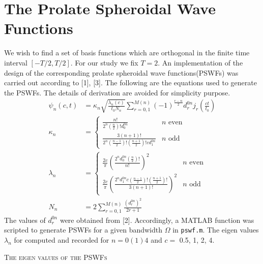 \documentclass[a4paper,10pt]{article}
\begin{document}
\section{The Prolate Spheroidal Wave Functions}
We wish to find a set of basis functions which are orthogonal in the finite time interval $[-T/2, T/2]$. For our study we fix $T=2$. An implementation of the design of the corresponding prolate spheroidal wave functions(PSWFs) was carried out according to [1], [3]. The following are the equations used to generate the PSWFs. The details of derivation are avoided for simplicity purpose.
\begin{align}
\psi_n(c, t) &=  \kappa_n  \sqrt{ \frac{\lambda_n(c)}{t_0 N_n} }\sum_{r=0,1}^{M(n)} (-1)^{\frac{r-n}{2}} d_r^{0n} j_r \left(\frac{ct}{t_0}\right) \\
\kappa_n &=  \begin{cases} 
      \frac{n!}{2^n ( \frac{n}{2})!  d_0^{0n} }  & n \text{ even} \\
      \frac{3 (n+1)!}{2^n ( \frac{n-1}{2})! ( \frac{n+1}{2} )! c d_1^{0n} } & n \text{ odd}
   \end{cases} \nonumber \\
\lambda_n &=  \begin{cases}
				\frac{2c}{\pi} \left( \frac{2^n d_0^{0n} ( \frac{n}{2})! }{n!} \right)^2 & n \text{ even} \nonumber \\
				\frac{2c}{\pi} \left( \frac{2^n d_1^{0n} c ( \frac{n-1}{2})! ( \frac{n+1}{2})! }{3(n+1)!} \right)^2 & n \text{ odd}
   \end{cases} \nonumber \\
N_n &= 2 \sum_{r=0,1}^{M(n)} \frac{(d_r^{0n})^2}{2r+1} \nonumber
\end{align} 
The values of $d_r^{0n}$ were obtained from [2]. Accordingly, a MATLAB function was scripted to generate PSWFs for a given bandwidth $\Omega$ in \texttt{pswf.m}. The eigen values $\lambda_n$ for computed and recorded for $n = 0(1)4$ and $c = $ 0.5, 1, 2, 4.
\begin{center}
\textsc{The eigen values of the PSWFs}
\end{center}
\end{document}
